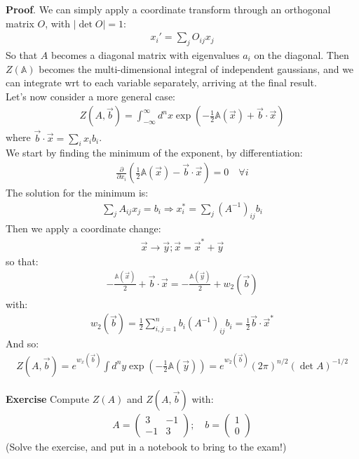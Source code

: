 \documentclass[../template.tex]{subfiles}
\begin{document}
\textbf{Proof}. We can simply apply a coordinate transform through an orthogonal matrix $O$, with $|\operatorname{det}O|=1$:
\begin{align*}
    x_i' = \sum_j O_{ij}x_j
\end{align*}    
So that $A$ becomes a diagonal matrix with eigenvalues $a_i$ on the diagonal. Then $Z(\mathbb{A})$ becomes the multi-dimensional integral of independent gaussians, and we can integrate wrt to each variable separately, arriving at the final result.\\

Let's now consider a more general case:
\begin{align*}
    Z(A, \vec{b}) = \int_{-\infty}^{\infty} d^n x \exp\left(-\frac{1}{2} \mathbb{A}(\vec{x}) + \vec{b} \cdot \vec{x} \right)
\end{align*}
where $\vec{b}\cdot \vec{x} = \sum_i x_i b_i$.\\
We start by finding the minimum of the exponent, by differentiation:
\begin{align*}
    \frac{\partial}{\partial x_i} \left(\frac{1}{2} \mathbb{A}(\vec{x}) - \vec{b} \cdot \vec{x} \right)  = 0 \quad \forall i
\end{align*} 
The solution for the minimum is:
\begin{align*}
    \sum_j A_{ij} x_j = b_i \Rightarrow x_i^* = \sum_j (A^{-1})_{ij} b_i
\end{align*}
Then we apply a coordinate change:
\begin{align*}
    \vec{x} \rightarrow \vec{y}; \vec{x} = \vec{x}^* + \vec{y}
\end{align*}
so that:
\begin{align*}
    -\frac{\mathbb{A}(\vec{x})}{2} + \vec{b}\cdot \vec{x} = -\frac{\mathbb{A}(\vec{y})}{2} + w_2(\vec{b})  
\end{align*}
with:
\begin{align*}
    w_2(\vec{b}) = \frac{1}{2} \sum_{i,j=1}^n b_i (A^{-1})_{ij} b_i = \frac{1}{2} \vec{b}\cdot \vec{x}^*  
\end{align*}
And so:
\begin{align*}
    Z(A,\vec{b}) = e^{w_x(\vec{b})} \int d^n y \exp \left(-\frac{1}{2} \mathbb{A}(\vec{y}) \right) = e^{w_2(\vec{b})} (2\pi)^{n/2} (\operatorname{det} A )^{-1/2}
\end{align*}

\textbf{Exercise}
Compute $Z(A)$ and $Z(A,\vec{b})$ with:
\begin{align*}
    A = \left(\begin{array}{cc}
    3 & -1 \\ 
    -1 & 3
    \end{array}\right); \quad b = \left(\begin{array}{c}
    1 \\ 
    0
    \end{array}\right)
\end{align*}   
(Solve the exercise, and put in a notebook to bring to the exam!)
\end{document}
